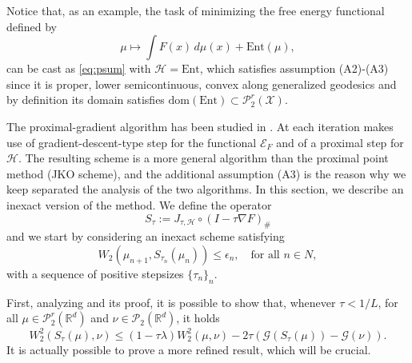 \documentclass[11pt]{article}
\newcommand{\cP}{\mathcal{P}}
\newcommand{\cE}{\mathcal{E}}
\newcommand{\cG}{\mathcal{G}}
\newcommand{\cT}{S}
\newcommand{\calH}{\mathcal{H}}
\newcommand{\R}{\mathbb{R}}
\numberwithin{equation}{section}
\begin{document}
	\smallskip
	
	Notice that, as an example, the task of minimizing the free energy functional defined by
	\[\mu \mapsto \int F(x) \, d\mu(x) + \text{Ent}(\mu),\]
	can be cast as \eqref{eq:psum} with $\mathcal{H}= \text{Ent}$, which satisfies assumption (A2)-(A3) since it is proper, lower semicontinuous, convex along generalized geodesics and by definition its domain satisfies $\text{dom}(\text{Ent})\subset \cP_2^r(\mathcal{X})$.
	
	The proximal-gradient algorithm has been studied in \cite{WPG2020}. At each iteration makes use of gradient-descent-type step for the functional $\cE_F$ and of a proximal step for $\mathcal{H}$. The resulting scheme is a more general algorithm than the proximal point method (JKO scheme), and the additional assumption (A3) is the reason why we keep separated the analysis of the two algorithms. In this section, we describe an inexact version of the method. We define the operator \[\cT_{\tau}:=J_{\tau , \calH}\circ (I-\tau \nabla F)_{\#}\] and we start by considering an inexact scheme satisfying
	\begin{equation}\label{eq:FB}
		W_2(\mu_{n+1},\cT_{\tau_n}(\mu_n))\leq \epsilon_n, \quad \text{for all } n \in N,
	\end{equation}
	with a sequence of positive stepsizes $\{\tau_n\}_{n}.$

First, analyzing \cite[Proposition 8]{WPG2020} and its proof, it is possible to show that, whenever $\tau < 1/L$, for all $\mu \in \cP_2^r(\R^d)$ and $\nu\in \cP_2(\R^d)$, it holds
\begin{equation}\label{eq:discrete_EVI_FB}
	W_2^2(\cT_{\tau}(\mu), \nu)\leq (1-\tau \lambda)W_2^2(\mu,\nu)-2\tau (\cG(\cT_{\tau}(\mu))-\cG(\nu)).
\end{equation}
It is actually possible to prove a more refined result, which will be crucial.
\end{document}
